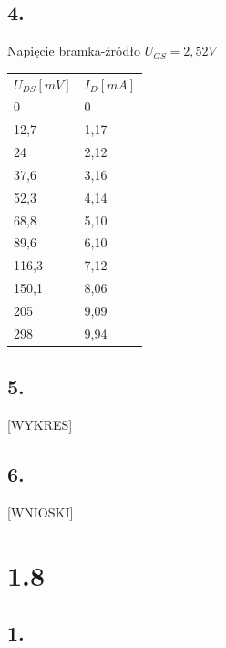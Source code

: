 \documentclass[polish,a4paper]{article}
\begin{document}
\subsection*{4.}

Napięcie bramka-źródło $U_{GS} = 2,52V$

\begin{center}
\begin{tabular}{|l|l|}
\hline
\textbf{$U_{DS} [mV]$} & \textbf{$I_D [mA]$}\\
\hhline{|=|=|}
0 & 0 \\
\hline
12,7 & 1,17 \\
\hline
24 & 2,12 \\
\hline
37,6 & 3,16 \\
\hline
52,3 & 4,14 \\
\hline
68,8 & 5,10 \\
\hline
89,6 & 6,10 \\
\hline
116,3 & 7,12 \\
\hline
150,1 & 8,06 \\
\hline
205 & 9,09 \\
\hline
298& 9,94 \\
\hline

\end{tabular}
\end{center}

\subsection*{5.}
[WYKRES]


\subsection*{6.}
[WNIOSKI]

\newpage
\section{1.8}

\subsection*{1.}
\end{document}
